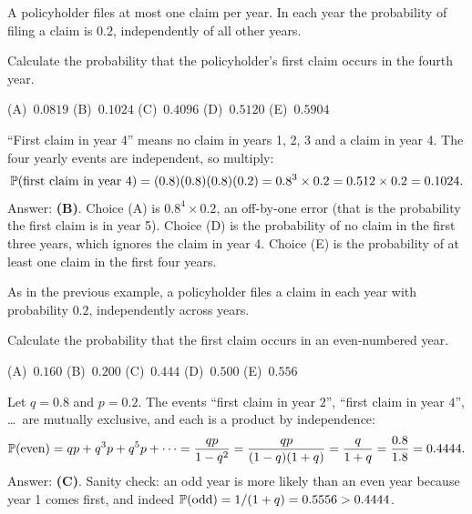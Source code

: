 \begin{example}
A policyholder files at most one claim per year. In each year the probability of filing a claim is $0.2$, independently of all other years.

Calculate the probability that the policyholder's first claim occurs in the fourth year.

\begin{center}
(A)~$0.0819$ \quad (B)~$0.1024$ \quad (C)~$0.4096$ \quad (D)~$0.5120$ \quad (E)~$0.5904$
\end{center}
\end{example}
\begin{solution}
``First claim in year 4'' means no claim in years 1, 2, 3 and a claim in year 4. The four yearly events are independent, so multiply:
\[
\mathbb{P}(\text{first claim in year 4}) = (0.8)(0.8)(0.8)(0.2) = 0.8^3 \times 0.2 = 0.512 \times 0.2 = 0.1024.
\]
Answer: \textbf{(B)}. Choice (A) is $0.8^4 \times 0.2$, an off-by-one error (that is the probability the first claim is in year 5). Choice (D) is the probability of no claim in the first three years, which ignores the claim in year 4. Choice (E) is the probability of at least one claim in the first four years.
\end{solution}

\begin{example}
As in the previous example, a policyholder files a claim in each year with probability $0.2$, independently across years.

Calculate the probability that the first claim occurs in an even-numbered year.

\begin{center}
(A)~$0.160$ \quad (B)~$0.200$ \quad (C)~$0.444$ \quad (D)~$0.500$ \quad (E)~$0.556$
\end{center}
\end{example}
\begin{solution}
Let $q = 0.8$ and $p = 0.2$. The events ``first claim in year $2$'', ``first claim in year $4$'', \dots\ are mutually exclusive, and each is a product by independence:
\[
\mathbb{P}(\text{even}) = qp + q^3 p + q^5 p + \cdots = \frac{qp}{1 - q^2} = \frac{qp}{(1-q)(1+q)} = \frac{q}{1+q} = \frac{0.8}{1.8} = 0.4444.
\]
Answer: \textbf{(C)}. Sanity check: an odd year is more likely than an even year because year 1 comes first, and indeed $\mathbb{P}(\text{odd}) = 1/(1+q) = 0.5556 > 0.4444$.
\end{solution}

